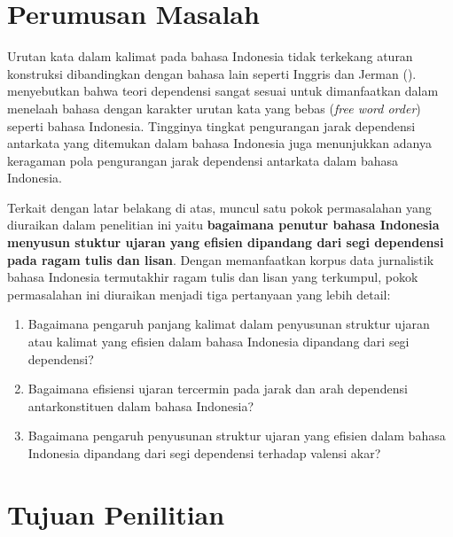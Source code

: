 

\section{Perumusan Masalah}

Urutan kata dalam kalimat pada bahasa Indonesia tidak terkekang aturan konstruksi dibandingkan dengan bahasa lain seperti Inggris dan Jerman (\citealp{stack2005word, futrell2015large, irmawati2015dependency}). \cite{kubler2009dependency} menyebutkan bahwa teori dependensi sangat sesuai untuk dimanfaatkan dalam menelaah bahasa dengan karakter urutan kata yang bebas (\textit{free word order}) seperti bahasa Indonesia. Tingginya tingkat pengurangan jarak dependensi antarkata yang ditemukan dalam bahasa Indonesia \citep{futrell2015large} juga menunjukkan adanya keragaman pola pengurangan jarak dependensi antarkata dalam bahasa Indonesia.

Terkait dengan latar belakang di atas, muncul satu pokok permasalahan yang diuraikan dalam penelitian ini yaitu \textbf{bagaimana penutur bahasa Indonesia menyusun stuktur ujaran yang efisien dipandang dari segi dependensi pada ragam tulis dan lisan}. Dengan memanfaatkan korpus data jurnalistik bahasa Indonesia termutakhir ragam tulis dan lisan yang terkumpul, pokok permasalahan ini diuraikan menjadi tiga pertanyaan yang lebih detail:

\begin{enumerate}
	\item Bagaimana pengaruh panjang kalimat dalam penyusunan struktur ujaran atau kalimat yang efisien dalam bahasa Indonesia dipandang dari segi dependensi?
	\item Bagaimana efisiensi ujaran tercermin pada jarak dan arah dependensi antarkonstituen dalam bahasa Indonesia?
	\item Bagaimana pengaruh penyusunan struktur ujaran yang efisien dalam bahasa Indonesia dipandang dari segi dependensi terhadap valensi akar?
\end{enumerate}

\section{Tujuan Penilitian}

